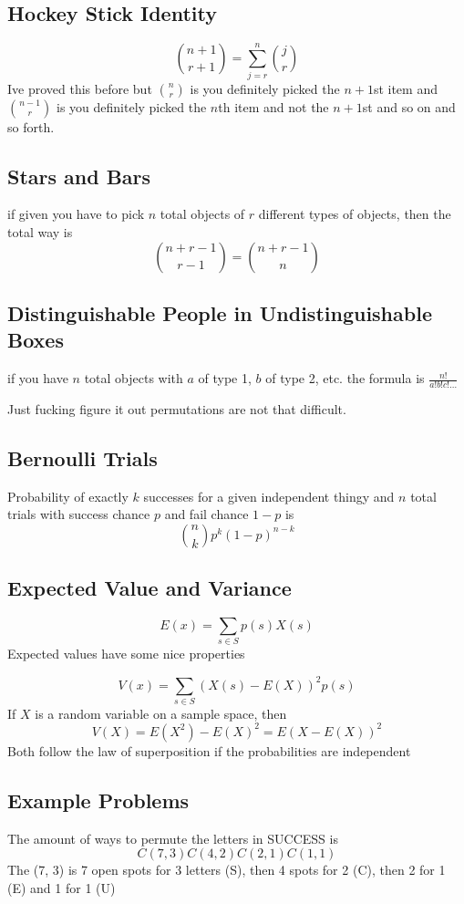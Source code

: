 \documentclass{report}
\begin{document}
 \subsection{Hockey Stick Identity}
 \[
 {n+1 \choose r+1 } = \sum_{j=r}^n {j \choose r}
 \]
 Ive proved this before but ${n \choose r}$ is you definitely picked the $n+1$st item and ${n - 1 \choose r}$ is you definitely picked the $n$th item and not the $n+1$st and so on and so forth.
 
\subsection{Stars and Bars}
if given you have to pick $n$ total objects of $r$ different types of objects, then the total way is
\[
{n + r - 1 \choose r-1}
=
{n + r - 1 \choose n}
\]


\subsection{Distinguishable People in Undistinguishable Boxes}
if you have $n$ total objects with $a$ of type 1, $b$ of type 2, etc. the formula is
$\frac{n!}{a!b!c!\ldots}$

Just fucking figure it out permutations are not that difficult.

\subsection{Bernoulli Trials}
Probability of exactly $k$ successes for a given independent thingy and $n$ total trials with success chance $p$ and fail chance $1 - p$ is 
\[
{n \choose k} p^k (1 - p)^{n - k}
\]


\subsection{Expected Value and Variance}
\[
E(x) = \sum_{s \in S}p(s)X(s)
\]
Expected values have some nice properties

\[
V(x)
=
\sum_{s \in S}(X(s) - E(X))^2p(s)
\]
If $X$ is a random variable on a sample space, then
\[
V(X) = E(X^2) - E(X)^2
=
E(X - E(X))^2
\]
Both follow the law of superposition if the probabilities are independent


\subsection{Example Problems}
The amount of ways to permute the letters in SUCCESS is
\[
C(7, 3)C(4, 2)C(2, 1)C(1, 1)
\]
The (7, 3) is 7 open spots for 3 letters (S), then 4 spots for 2 (C), then 2 for 1 (E) and 1 for 1 (U)
\end{document}
